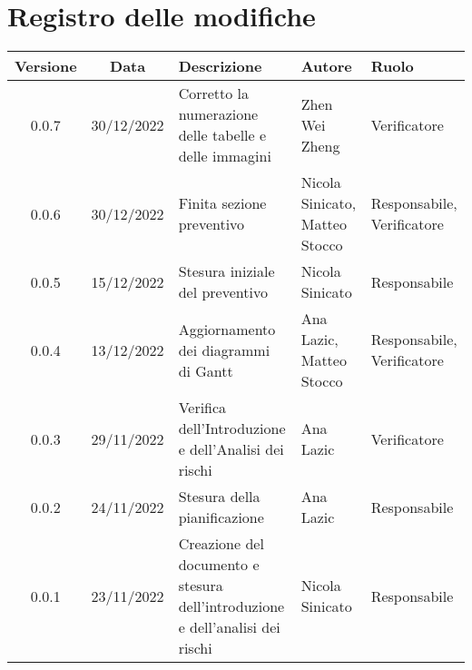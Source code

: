 \section*{Registro delle modifiche}
\begin{table}[H]
	\centering
	\renewcommand\tabularxcolumn[1]{>{\Centering}m{#1}}
	\begin{tabularx}{\textwidth}{| c | c | X | X | X |} 
	\hline
	\textbf{Versione} & \textbf{Data} & \textbf{Descrizione} & \textbf{Autore} & \textbf{Ruolo}\\
	\hline
	0.0.7 & 30/12/2022 & Corretto la numerazione delle tabelle e delle immagini & Zhen Wei Zheng & Verificatore\\
	\hline
	0.0.6 & 30/12/2022 & Finita sezione preventivo & Nicola Sinicato, Matteo Stocco & Responsabile, Verificatore\\
	\hline
	0.0.5 & 15/12/2022 & Stesura iniziale del preventivo & Nicola Sinicato & Responsabile\\
	\hline
	0.0.4 & 13/12/2022 & Aggiornamento dei diagrammi di Gantt & Ana Lazic, Matteo Stocco & Responsabile, Verificatore\\
	\hline
	0.0.3 & 29/11/2022 & Verifica dell'Introduzione e dell'Analisi dei rischi & Ana Lazic & Verificatore\\
	\hline
	0.0.2 & 24/11/2022 & Stesura della pianificazione & Ana Lazic & Responsabile\\
	\hline
	0.0.1 & 23/11/2022 & Creazione del documento e stesura dell'introduzione e dell'analisi dei rischi & Nicola Sinicato & Responsabile\\
 	\hline
	\end{tabularx}
\end{table}
